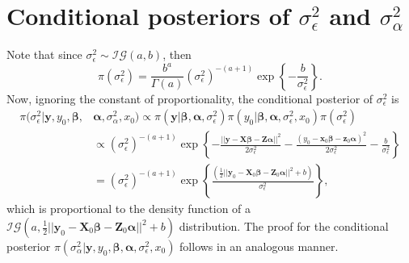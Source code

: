 \documentclass[cmfont,usenames,dvipsnames,leqno]{afit-etd}\usepackage[]{graphicx}\usepackage[]{color}
\begin{document}
\section{Conditional posteriors of \texorpdfstring{$\sigma_\epsilon^2$ and $\sigma_\alpha^2$}{variance components}}
\label{sec:conditional-variances}
Note that since $\sigma_\epsilon^2 \sim \mathcal{IG}\left(a, b\right)$, then 
\begin{equation*}
  \pi(\sigma_\epsilon^2) = \frac{b^a}{\Gamma(a)}\left(\sigma_\epsilon^2\right)^{-(a+1)}\exp\left\{-\frac{b}{\sigma_\epsilon^2}\right\}.
\end{equation*}
Now, ignoring the constant of proportionality, the conditional posterior of $\sigma_\epsilon^2$ is
\begin{align*}
  \pi(\sigma_\epsilon^2|\boldsymbol{y}, y_0, \boldsymbol{\beta}, &\boldsymbol{\alpha}, \sigma_\alpha^2, x_0) \propto \pi(\boldsymbol{y}|\boldsymbol{\beta}, \boldsymbol{\alpha}, \sigma_\epsilon^2)\pi(y_0|\boldsymbol{\beta}, \boldsymbol{\alpha}, \sigma_\epsilon^2, x_0)\pi(\sigma_\epsilon^2) \\
  &\propto \left(\sigma_\epsilon^2\right)^{-(a+1)}\exp\left\{-\frac{||\boldsymbol{y} - \boldsymbol{X}\boldsymbol{\beta} - \boldsymbol{Z}\boldsymbol{\alpha}||^2}{2\sigma_\epsilon^2} - \frac{\left(y_0 - \boldsymbol{x}_0\boldsymbol{\beta} - \boldsymbol{z}_0\boldsymbol{\alpha}\right)^2}{2\sigma_\epsilon^2} - \frac{b}{\sigma_\epsilon^2}\right\} \\
  &= \left(\sigma_\epsilon^2\right)^{-(a+1)}\exp\left\{\frac{\left(\frac{1}{2}||\boldsymbol{y}_0 - \boldsymbol{X}_0\boldsymbol{\beta} - \boldsymbol{Z}_0\boldsymbol{\alpha}||^2 + b\right)}{\sigma_\epsilon^2}\right\},
\end{align*}
which is proportional to the density function of a $\mathcal{IG}\left(a, \frac{1}{2}||\boldsymbol{y}_0 - \boldsymbol{X}_0\boldsymbol{\beta} - \boldsymbol{Z}_0\boldsymbol{\alpha}||^2 + b\right)$ distribution. The proof for the conditional posterior $\pi(\sigma_\alpha^2|\boldsymbol{y}, y_0, \boldsymbol{\beta}, \boldsymbol{\alpha}, \sigma_\epsilon^2, x_0)$ follows in an analogous manner.
\end{document}
